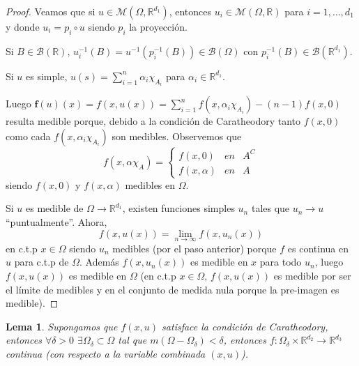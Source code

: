 \documentclass[a4paper,11pt]{amsart}
\theoremstyle{plain}
\newtheorem{lem}[thm]{Lema}
\theoremstyle{remark}
\theoremstyle{remark}
\newcommand{\rr}{\mathbb{R}}
\newcommand{\bb}{\mathcal{B}}
\newcommand{\fnet}{\boldsymbol{f}}
\numberwithin{equation}{section}
\begin{document}
\begin{proof}
Veamos que si $u \in \mathcal{M}(\Omega, \rr^{d_1})$, entonces $u_i \in  \mathcal{M}(\Omega, \rr)$ para $i=1,\dots,d_1$ y 
donde $u_i=p_i\circ u$ siendo $p_i$ la proyecci\'on.

Si $B\in \bb(\rr)$, $u_i^{-1}(B)=u^{-1}(p^{-1}_i(B))\in \bb(\Omega)$ con $p^{-1}_i(B)\in \bb(\rr^{d_1})$.


Si $u$ es simple, $u(s)=\sum\limits_{i=1}^{n} \alpha_i \chi_{A_i}$ para $\alpha_i \in \rr^{d_1}$.

Luego $\fnet(u)(x)=f(x,u(x))=\sum\limits_{i=1}^n f(x,\alpha_i \chi_{A_i})-(n-1)f(x,0)$
resulta medible porque, debido a la condici\'on de Caratheodory tanto $f(x,0)$ como cada $f(x,\alpha_i \chi_{A_i})$ son medibles.
Observemos que 
\[
f(x,\alpha \chi_{A})=\left\{
\begin{array}{lll}
f(x,0)&en&A^C
\\
f(x,\alpha)&en&A
\end{array}
\right.
\]
siendo $f(x,0)$ y $f(x,\alpha)$ medibles en $\Omega$.

Si $u$ es medible de $\Omega \to \rr^{d_1}$, existen funciones simples $u_n$ tales que $u_n \to u$ ``puntualmente''. 
Ahora, 
\[
f(x,u(x))=\lim\limits_{n \to \infty} f(x,u_n(x))
\] 
en c.t.p $x \in \Omega$ siendo $u_n$ medibles (por el paso anterior) porque $f$ es continua en $u$ para c.t.p de $\Omega$.
Adem\'as $f(x,u_n(x))$ es medible en $x$ para todo $u_n$, luego $f(x,u(x))$ es medible en $\Omega$
(en c.t.p $x \in \Omega$, $f(x,u(x))$ es medible por ser el l\'imite de medibles y en el conjunto de medida nula porque la pre-imagen es medible).
\end{proof}

\begin{lem}
Supongamos que $f(x,u)$ satisface la condici\'on de Caratheodory, entonces $\forall \delta >0$ $\exists \Omega_{\delta}\subset \Omega$
tal que $m(\Omega-\Omega_{\delta})<\delta$, entonces $f:\Omega_{\delta}\times \rr^{d_2}\to \rr^{d_3}$ continua (con respecto a la variable combinada $(x,u)$).
\end{lem}
\end{document}

